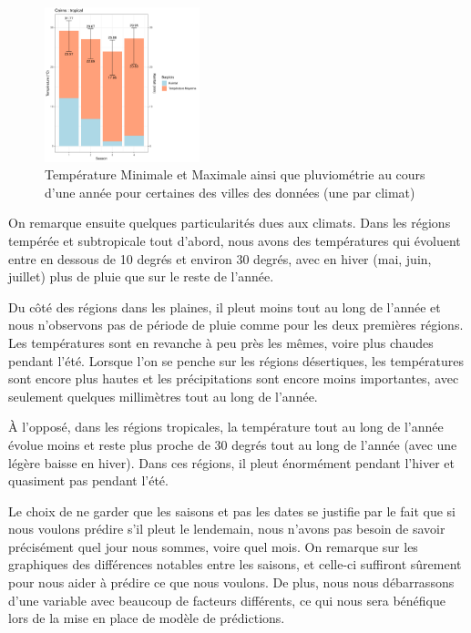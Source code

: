 \documentclass{article}
\begin{document}
\begin{figure}[p]
        \includegraphics[page=1,width=0.4\textwidth]{Images/temp_and_rainfall/Temp_and_Rainfalltropical.pdf}
    \caption{Température Minimale et Maximale ainsi que pluviométrie au cours d'une année pour certaines des villes des données (une par climat)}
    \label{fig:temp_and_rainfall}
\end{figure}

On remarque ensuite quelques particularités dues aux climats. Dans les régions tempérée et subtropicale tout d'abord, nous avons des températures qui évoluent entre en dessous de 10 degrés et environ 30 degrés, avec en hiver (mai, juin, juillet) plus de pluie que sur le reste de l'année.

Du côté des régions dans les plaines, il pleut moins tout au long de l'année et nous n'observons pas de période de pluie comme pour les deux premières régions. Les températures sont en revanche à peu près les mêmes, voire plus chaudes pendant l'été. Lorsque l'on se penche sur les régions désertiques, les températures sont encore plus hautes et les précipitations sont encore moins importantes, avec seulement quelques millimètres tout au long de l'année. 

À l'opposé, dans les régions tropicales, la température tout au long de l'année évolue moins et reste plus proche de 30 degrés tout au long de l'année (avec une légère baisse en hiver). Dans ces régions, il pleut énormément pendant l'hiver et quasiment pas pendant l'été.

Le choix de ne garder que les saisons et pas les dates se justifie par le fait que si nous voulons prédire s'il pleut le lendemain, nous n'avons pas besoin de savoir précisément quel jour nous sommes, voire quel mois. On remarque sur les graphiques des différences notables entre les saisons, et celle-ci suffiront sûrement pour nous aider à prédire ce que nous voulons. De plus, nous nous débarrassons d'une variable avec beaucoup de facteurs différents, ce qui nous sera bénéfique lors de la mise en place de modèle de prédictions.
\end{document}
